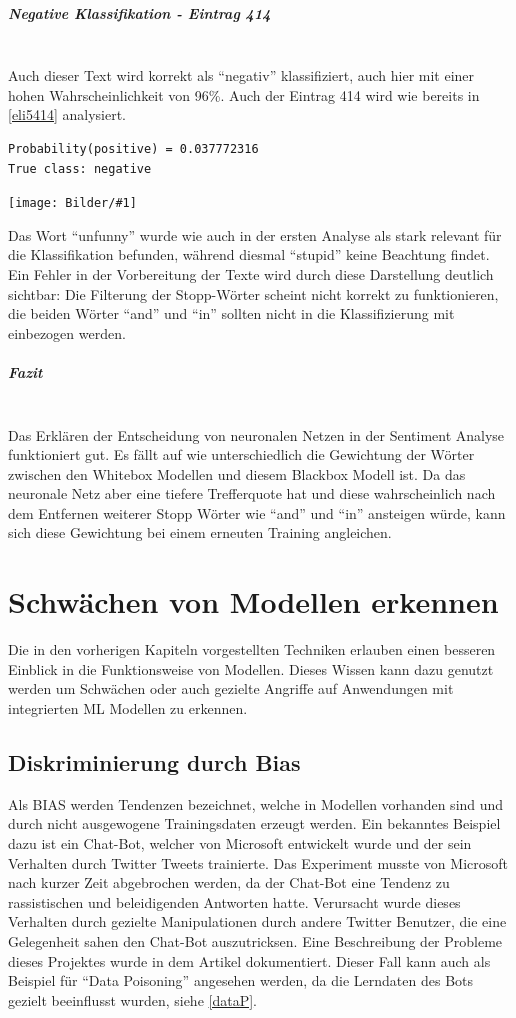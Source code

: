 \documentclass[
  12pt, %
  a4paper, %
  oneside, %
  openany, 
  numbers=noenddot, %
  BCOR=5mm, %
  parskip=half*, %
  thesis, %
]{bfhbook}
\newcommand{\parag}[1]{\paragraph*{#1}\mbox{}\\}
\newcommand{\imgText}[3]{
\begin{center}
    \begin{minipage}[t]{0.6\textwidth}
    		\vspace{0pt}
		\texttt{[image: Bilder/\#1]}
		\captionof{figure}{#2}
	\end{minipage}\hfill
    \begin{minipage}[t]{0.4\textwidth}
    		\vspace{5pt}
  		#3
    \end{minipage}
\end{center}
}
\begin{document}
\parag{Negative Klassifikation - Eintrag 414}
Auch dieser Text wird korrekt als ``negativ'' klassifiziert, auch hier mit einer hohen Wahrscheinlichkeit von 96\%.
Auch der Eintrag 414 wird wie bereits in \ref{eli5414} analysiert.
\begin{lstlisting}
Probability(positive) = 0.037772316
True class: negative
\end{lstlisting}
\imgText{MovieReview-LSTM-Display-414.PNG}{Visualisierung Movie Review 414}{
Das Wort ``unfunny'' wurde wie auch in der ersten Analyse als stark relevant für die Klassifikation befunden, während diesmal ``stupid'' keine Beachtung findet. Ein Fehler in der Vorbereitung der Texte wird durch diese Darstellung deutlich sichtbar: Die Filterung der Stopp-Wörter scheint nicht korrekt zu funktionieren, die beiden Wörter ``and'' und ``in'' sollten nicht in die Klassifizierung mit einbezogen werden.
}

\parag{Fazit}
Das Erklären der Entscheidung von neuronalen Netzen in der Sentiment Analyse funktioniert gut. Es fällt auf wie unterschiedlich die Gewichtung der Wörter zwischen den Whitebox Modellen und diesem Blackbox Modell ist. Da das neuronale Netz aber eine tiefere Trefferquote hat und diese wahrscheinlich nach dem Entfernen weiterer Stopp Wörter wie ``and'' und ``in'' ansteigen würde, kann sich diese Gewichtung bei einem erneuten Training angleichen.

\chapter{Schwächen von Modellen erkennen}
\label{vulnearabilities}

Die in den vorherigen Kapiteln vorgestellten Techniken erlauben einen besseren Einblick in die Funktionsweise von  Modellen. Dieses Wissen kann dazu genutzt werden um Schwächen oder auch gezielte Angriffe auf Anwendungen mit integrierten \Gls{ML} Modellen zu erkennen.

\section{Diskriminierung durch Bias}
Als \Gls{BIAS} werden Tendenzen bezeichnet, welche in Modellen vorhanden sind und durch nicht ausgewogene Trainingsdaten erzeugt werden.
Ein bekanntes Beispiel dazu ist ein Chat-Bot, welcher von Microsoft entwickelt wurde und der sein Verhalten durch Twitter Tweets trainierte. Das Experiment musste von Microsoft nach kurzer Zeit abgebrochen werden, da der Chat-Bot eine Tendenz zu rassistischen und beleidigenden Antworten hatte. Verursacht wurde dieses Verhalten durch gezielte Manipulationen durch andere Twitter Benutzer, die eine Gelegenheit sahen den Chat-Bot auszutricksen. Eine Beschreibung der Probleme dieses Projektes wurde in dem Artikel \parencite{msTay} dokumentiert.
Dieser Fall kann auch als Beispiel für ``Data Poisoning'' angesehen werden, da die Lerndaten des Bots gezielt beeinflusst wurden, siehe \ref{dataP}.
\end{document}
